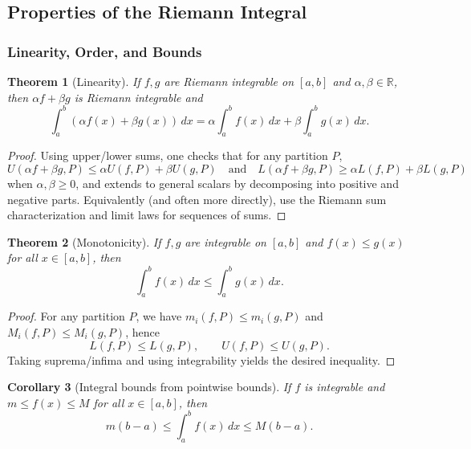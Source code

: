 \documentclass[12pt]{article}
\numberwithin{equation}{section}
\def\diff{d}
\newcommand{\RR}{\mathbb{R}}
\newcommand{\diff}{\mathop{}\!\mathrm{d}}    %
\theoremstyle{plain}
\newtheorem{theorem}{Theorem}[section]
\newtheorem{corollary}[theorem]{Corollary}
\theoremstyle{definition}
\theoremstyle{remark}
\begin{document}
\newpage

\subsection{Properties of the Riemann Integral}

\subsubsection{Linearity, Order, and Bounds}

\begin{theorem}[Linearity]\label{thm:int-linearity}
If $f,g$ are Riemann integrable on $[a,b]$ and $\alpha,\beta\in\RR$, then $\alpha f+\beta g$ is Riemann integrable and
\[
\int_a^b (\alpha f(x)+\beta g(x))\,\diff x
=
\alpha\int_a^b f(x)\,\diff x+\beta\int_a^b g(x)\,\diff x.
\]
\end{theorem}

\begin{proof}
Using upper/lower sums, one checks that for any partition $P$,
\[
U(\alpha f+\beta g,P)\le \alpha U(f,P)+\beta U(g,P)
\quad\text{and}\quad
L(\alpha f+\beta g,P)\ge \alpha L(f,P)+\beta L(g,P)
\]
when $\alpha,\beta\ge 0$, and extends to general scalars by decomposing into positive and negative parts.
Equivalently (and often more directly), use the Riemann sum characterization  and limit laws for sequences of sums.
\end{proof}

\begin{theorem}[Monotonicity]\label{thm:int-monotone}
If $f,g$ are integrable on $[a,b]$ and $f(x)\le g(x)$ for all $x\in[a,b]$, then
\[
\int_a^b f(x)\,\diff x \le \int_a^b g(x)\,\diff x.
\]
\end{theorem}

\begin{proof}
For any partition $P$, we have $m_i(f,P)\le m_i(g,P)$ and $M_i(f,P)\le M_i(g,P)$, hence
\[
L(f,P)\le L(g,P),\qquad U(f,P)\le U(g,P).
\]
Taking suprema/infima and using integrability yields the desired inequality.
\end{proof}

\begin{corollary}[Integral bounds from pointwise bounds]\label{cor:int-bounds}
If $f$ is integrable and $m\le f(x)\le M$ for all $x\in[a,b]$, then
\[
m(b-a)\le \int_a^b f(x)\,\diff x \le M(b-a).
\]
\end{corollary}
\end{document}
